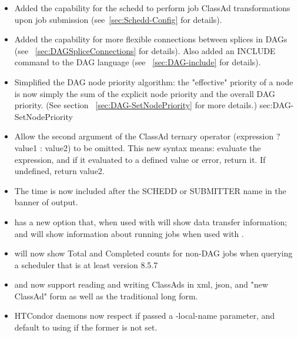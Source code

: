 \begin{itemize}

\item Added the capability for the schedd to perform job ClassAd
transformations upon job submission (see~\ref{sec:Schedd-Config}
for details).

\item Added the capability for more flexible connections between
splices in DAGs (see ~\ref{sec:DAGSpliceConnections} for details).
Also added an INCLUDE command to the DAG language (see
~\ref{sec:DAG-include} for details).

\item Simplified the DAG node priority algorithm:  the "effective" priority
of a node is now simply the sum of the explicit node priority and the
overall DAG priority.  (See section ~\ref{sec:DAG-SetNodePriority} for
more details.)
sec:DAG-SetNodePriority

\item Allow the second argument of the ClassAd ternary operator
(expression ? value1 : value2) to be omitted.  This new syntax means:
evaluate the expression, and if it evaluated to a defined value or
error, return it.  If undefined, return value2.

\item The time is now included after the SCHEDD or SUBMITTER name
in the banner of  output.

\item {} has a new  option that, when used with 
will show data transfer information; and  will show information about running
jobs when used with .

\item {}  will now show Total and Completed counts for non-DAG jobs
when querying a scheduler that is at least version 8.5.7

\item {} and  now support reading and writing ClassAds
in xml, json, and "new ClassAd" form as well as the traditional long form.

\item HTCondor daemons now respect 
if passed a -local-name parameter, and default to using
 if the former is not set.


\end{itemize}
